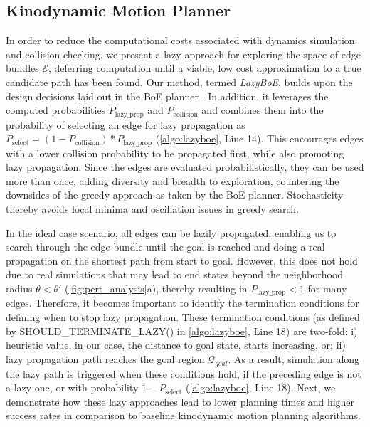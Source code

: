 

\subsection{Kinodynamic Motion Planner}\label{sec:methods-planner}
In order to reduce the computational costs associated with dynamics simulation and collision checking, we present a lazy approach for exploring the space of edge bundles $\mathcal{E}$, deferring computation until a viable, low cost approximation to a true candidate path has been found.
Our method, termed \textsl{LazyBoE}, builds upon the design decisions laid out in the BoE planner \cite{shome2021asymptotically}. In addition, it leverages the computed probabilities $P_{\text{lazy\_prop}}$ and $P_{\text{collision}}$ and combines them into the probability of selecting an edge for lazy propagation as $P_{\text{select}} = (1 - P_{\text{collision}}) * P_{\text{lazy\_prop}}$ (\cref{algo:lazyboe}, Line 14). This encourages edges with a lower collision probability to be propagated first, while also promoting lazy propagation. Since the edges are evaluated probabilistically, they can be used more than once, adding diversity and breadth to exploration, countering the downsides of the greedy approach as taken by the BoE planner. Stochasticity thereby avoids local minima and oscillation issues in greedy search.

In the ideal case scenario, all edges can be lazily propagated, enabling us to search through the edge bundle until the goal is reached and doing a real propagation on the shortest path from start to goal. However, this does not hold due to real simulations that may lead to end states beyond the neighborhood radius $\theta < \theta'$ (\cref{fig:pert_analysis}a), thereby resulting in $P_{\text{lazy\_prop}} < 1$ for many edges. Therefore, it becomes important to identify the termination conditions for defining when to stop lazy propagation. These termination conditions (as defined by SHOULD\_TERMINATE\_LAZY() in \cref{algo:lazyboe}, Line 18) are two-fold: i) heuristic value, in our case, the distance to goal state, starts increasing, or; ii) lazy propagation path reaches the goal region $\mathcal{Q}_{goal}$.
As a result, simulation along the lazy path is triggered when these conditions hold, if the preceding edge is not a lazy one, or with probability $1 - P_{\text{select}}$ (\cref{algo:lazyboe}, Line 18).
Next, we demonstrate how these lazy approaches lead to lower planning times and higher success rates in comparison to baseline kinodynamic motion planning algorithms.
